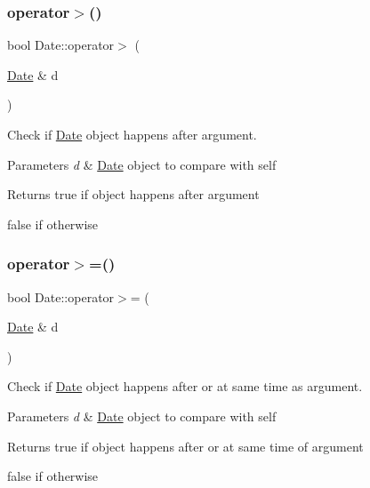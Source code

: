 \subsubsection{\texorpdfstring{operator$>$()}{operator>()}}
{\footnotesize\ttfamily bool Date\+::operator$>$ (\begin{DoxyParamCaption}\item[{\mbox{\hyperlink{classDate}{Date}} \&}]{d }\end{DoxyParamCaption})}



Check if \mbox{\hyperlink{classDate}{Date}} object happens after argument. 


\begin{DoxyParams}{Parameters}
{\em d} & \mbox{\hyperlink{classDate}{Date}} object to compare with self \\
\hline
\end{DoxyParams}
\begin{DoxyReturn}{Returns}
true if object happens after argument 

false if otherwise 
\end{DoxyReturn}
\mbox{\label{classDate_a3dd4c3c4818d69669927bec072ff85ce}} 
\subsubsection{\texorpdfstring{operator$>$=()}{operator>=()}}
{\footnotesize\ttfamily bool Date\+::operator$>$= (\begin{DoxyParamCaption}\item[{\mbox{\hyperlink{classDate}{Date}} \&}]{d }\end{DoxyParamCaption})}



Check if \mbox{\hyperlink{classDate}{Date}} object happens after or at same time as argument. 


\begin{DoxyParams}{Parameters}
{\em d} & \mbox{\hyperlink{classDate}{Date}} object to compare with self \\
\hline
\end{DoxyParams}
\begin{DoxyReturn}{Returns}
true if object happens after or at same time of argument 

false if otherwise 
\end{DoxyReturn}



